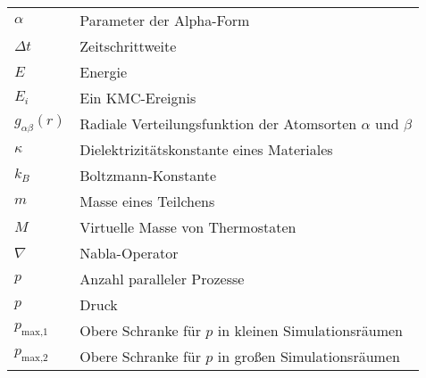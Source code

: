{
\def\arraystretch{1.5}
\begin{longtable}{ll}
$\alpha$             & Parameter der Alpha-Form                                            \\
$\Delta t$           & Zeitschrittweite                                                    \\
$E$                  & Energie                                                             \\
$E_i$                & Ein KMC-Ereignis                                                    \\
$g_{\alpha\beta}(r)$ & Radiale Verteilungsfunktion der Atomsorten $\alpha$ und $\beta$     \\
$\kappa$             & Dielektrizitätskonstante eines Materiales                           \\
$k_B$                & Boltzmann-Konstante                                                 \\
$m$                  & Masse eines Teilchens                                               \\
$M$                  & Virtuelle Masse von Thermostaten                                    \\
$\nabla$             & Nabla-Operator                                                      \\
$p$                  & Anzahl paralleler Prozesse                                          \\
$p$                  & Druck                                                               \\
$p_\text{max,1}$     & Obere Schranke für $p$ in kleinen Simulationsräumen                 \\
$p_\text{max,2}$     & Obere Schranke für $p$ in großen Simulationsräumen                  \\

\end{longtable}}
